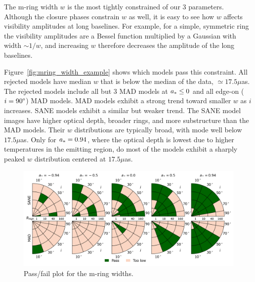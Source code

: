 
The m-ring width $w$ is the most tightly constrained of our 3 parameters. Although the closure phases constrain $w$ as well, it is easy to see how $w$ affects visibility amplitudes at long baselines. For example, for a simple, symmetric ring the visibility amplitudes are a Bessel function multiplied by a Gaussian with width $\sim 1/w$, and increasing $w$ therefore decreases the amplitude of the long baselines.

Figure~\ref{fig:mring_width_example} shows which models pass this constraint. All rejected models have median $w$ that is below the median of the data, $ \simeq 17.5\mu$as. The rejected models include all but 3 MAD models at $a_* \le 0$ and all edge-on ($i = 90\degree$) MAD models.  MAD models exhibit a strong trend toward smaller $w$ as $i$ increases.  SANE models exhibit a similar but weaker trend. The SANE model images have  higher optical depth, broader rings, and more substructure than the MAD models.  Their $w$ distributions are typically broad, with mode well below $17.5\mu$as.  Only for $a_* = 0.94$, where the optical depth is lowest due to higher temperatures in the emitting region, do most of the models exhibit a sharply peaked $w$ distribution centered at $17.5\mu$as.

\begin{figure}
 \centering
 \includegraphics[width=\textwidth]{./figures/Mring_w_Constraints.png}
  \caption{Pass/fail plot for the m-ring widths.}
\end{figure}


